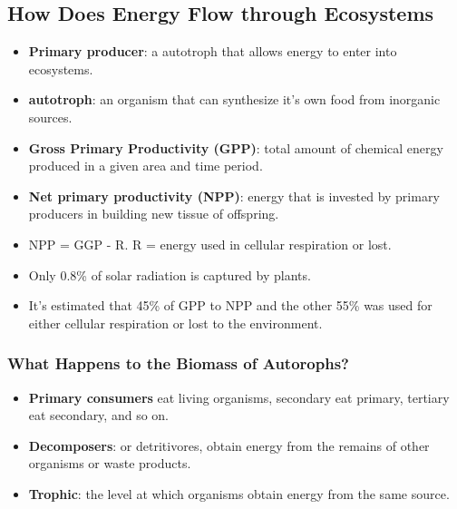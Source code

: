 \documentclass[12pt,a4paper]{article}
\begin{document}
\subsection{How Does Energy Flow through Ecosystems}
\begin{itemize}
    \item \textbf{Primary producer}: a autotroph that allows energy to enter into ecosystems.
    \item \textbf{autotroph}: an organism that can synthesize it's own food from inorganic sources.
    \item \textbf{Gross Primary Productivity (GPP)}: total amount of chemical energy produced in a given area and time period.
    \item \textbf{Net primary productivity (NPP)}: energy that is invested by primary producers in building new tissue of offspring.
    \item NPP = GGP - R. R = energy used in cellular respiration or lost.
    \item Only 0.8\% of solar radiation is captured by plants.
    \item It's estimated that 45\% of GPP to NPP and the other 55\% was used for either cellular respiration or lost to the environment.
\end{itemize}
    \subsubsection{What Happens to the Biomass of Autorophs?}
    \begin{itemize}
        \item \textbf{Primary consumers} eat living organisms, secondary eat primary, tertiary eat secondary, and so on.
        \item \textbf{Decomposers}: or detritivores, obtain energy from the remains of other organisms or waste products. 
        \item \textbf{Trophic}: the level at which organisms obtain energy from the same source.
    \end{itemize}
\end{document}
